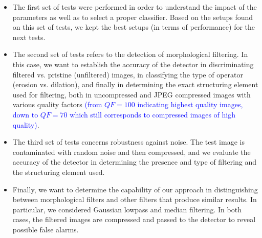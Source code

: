 \documentclass{ieeeaccess}
\begin{document}
\begin{itemize}
	\item The first set of tests were performed in order to understand the impact of the parameters as well as to select a proper classifier. Based on the setups found on this set of tests, we kept the best setups (in terms of performance) for the next tests.
	
	\item The second set of tests refers to the detection of morphological filtering. In this case, we want to establish the accuracy of the detector in discriminating filtered vs. pristine (unfiltered) images, in classifying the type of operator (erosion vs. dilation), and finally in determining the exact structuring element used for filtering, both in uncompressed and JPEG compressed images with various quality factors \textcolor{blue}{(from $QF=100$ indicating highest quality images, down to $QF=70$ which still corresponds to compressed images of high quality)}. 
	
	\item The third set of tests concerns robustness against noise. The test image is contaminated with random noise and then compressed, and we evaluate the accuracy of the detector in determining the presence and type of filtering and the structuring element used.
	
	\item Finally, we want to determine the capability of our approach in distinguishing between morphological filters and other filters that produce similar results. In particular, we considered Gaussian lowpass and median filtering. In both cases, the filtered images are compressed and passed to the detector to reveal possible false alarms.
	
\end{itemize}
\end{document}
